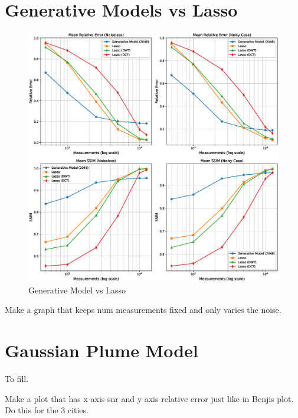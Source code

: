 \section{Generative Models vs Lasso}
\begin{figure}[h!]
    \centering
    \includegraphics[width=\textwidth]{figures/06_results/gen_vs_lasso.eps}
    \caption{Generative Model vs Lasso}
\end{figure}
Make a graph that keeps num measurements fixed and only varies the noise.

\section{Gaussian Plume Model}
To fill.

Make a plot that has x axis snr and y axis relative error just like in Benjis plot.
Do this for the 3 cities.

